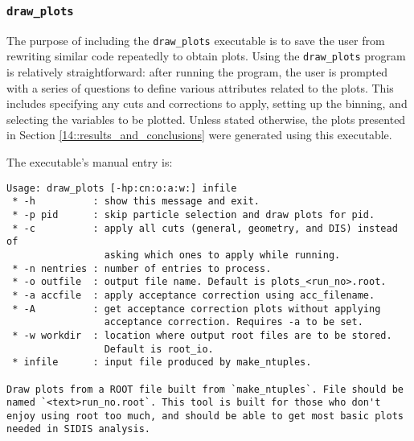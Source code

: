 \subsubsection{\texttt{draw\_plots}}
\label{14.15::draw_plots}
    The purpose of including the \texttt{draw\_plots} executable is to save the user from rewriting similar code repeatedly to obtain plots.
    Using the \texttt{draw\_plots} program is relatively straightforward: after running the program, the user is prompted with a series of questions to define various attributes related to the plots.
    This includes specifying any cuts and corrections to apply, setting up the binning, and selecting the variables to be plotted.
    Unless stated otherwise, the plots presented in Section \ref{14::results_and_conclusions} were generated using this executable.

    The executable's manual entry is:
    \begin{lstlisting}
Usage: draw_plots [-hp:cn:o:a:w:] infile
 * -h          : show this message and exit.
 * -p pid      : skip particle selection and draw plots for pid.
 * -c          : apply all cuts (general, geometry, and DIS) instead of
                 asking which ones to apply while running.
 * -n nentries : number of entries to process.
 * -o outfile  : output file name. Default is plots_<run_no>.root.
 * -a accfile  : apply acceptance correction using acc_filename.
 * -A          : get acceptance correction plots without applying
                 acceptance correction. Requires -a to be set.
 * -w workdir  : location where output root files are to be stored.
                 Default is root_io.
 * infile      : input file produced by make_ntuples.

Draw plots from a ROOT file built from `make_ntuples`. File should be named `<text>run_no.root`. This tool is built for those who don't enjoy using root too much, and should be able to get most basic plots needed in SIDIS analysis.
    \end{lstlisting}
